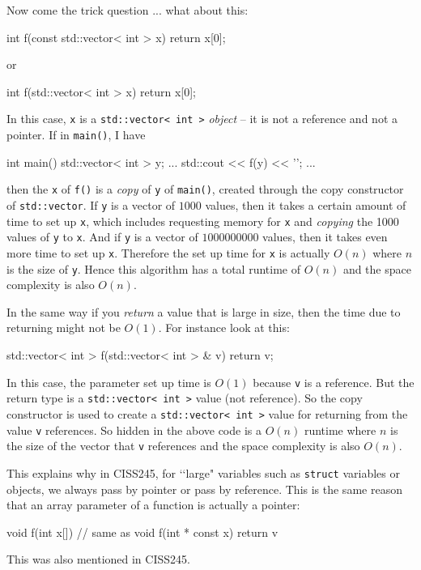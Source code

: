 Now come the trick question ... what about this:
\begin{console}
int f(const std::vector< int > x)
{
    return x[0];
}
\end{console}
or
\begin{console}
int f(std::vector< int > x)
{
    return x[0];
}
\end{console}
In this case, \verb!x! is a \verb!std::vector< int >! \textit{object} -- it is
not a reference and not a pointer.
If in \verb!main()!, I have
\begin{console}
int main()
{
    std::vector< int > y;
    ...
    std::cout << f(y) << '\n';
    ...
}
\end{console}
then the \verb!x! of \verb!f()! is a \textit{copy} of \verb!y! of \verb!main()!,
created through the
copy constructor of \verb!std::vector!.
If \verb!y! is a vector of $1000$ values, then it takes
a certain amount of time to set up \verb!x!,
which includes requesting memory for \verb!x! and
\textit{copying} the 1000 values of \verb!y! to \verb!x!.
And if \verb!y! is a vector of $1000000000$ values, then it
takes even more time to set up \verb!x!. 
Therefore the set up time for \verb!x! is actually $O(n)$
where $n$ is the size of \verb!y!.
Hence this algorithm has a total runtime of $O(n)$ and the space complexity is also
$O(n)$.

In the same way if you \textit{return} a value that is large in size, then the time
due to returning might not be $O(1)$.
For instance look at this:
\begin{console}
std::vector< int > f(std::vector< int > & v)
{
    return v;
}
\end{console}
In this case, the parameter set up time is $O(1)$ because \verb!v! is a reference.
But the return type is a \verb!std::vector< int >! value (not reference).
So the copy constructor is used to create a \verb!std::vector< int >! value
for returning
from the value \verb!v! references.
So hidden in the above code is a $O(n)$ runtime where $n$ is the
size of the vector that \verb!v! references
and the space complexity is also $O(n)$.

This explains why in CISS245,
for \lq\lq large" variables such as \verb!struct! variables or objects,
we always pass by pointer or pass by reference.
This is the same reason that an array parameter of a function
is actually a pointer:
\begin{console}
void f(int x[]) // same as void f(int * const x)
{
    return v
}
\end{console}
This was also mentioned in CISS245.

